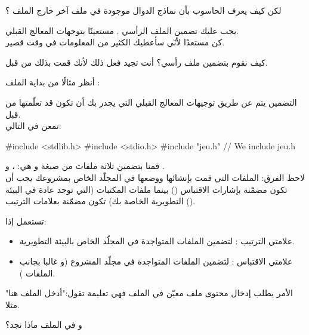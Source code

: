 \begin{question}
  لكن كيف يعرف الحاسوب بأن نماذج الدوال موجودة في ملف آخر خارج الملف
؟
\end{question}

يجب عليك تضمين الملف الرأسي
.
مستعينًا بتوجهات المعالج القبلي.\\
كن مستعدًا لأنّي سأعطيك الكثير من المعلومات في وقت قصير.

كيف نقوم بتضمين ملف رأسي؟ أنت تجيد فعل ذلك لأنك قمت بذلك من قبل.

أنظر مثالًا من بداية الملف
:

\begin{Csource}
#include <stdlib.h>
#include <stdio.h>
#include "jeu.h"
void play(SDL_Surface* screen)
{
// ...
\end{Csource}

التضمين يتم عن طريق توجيهات المعالج القبلي
التي يجدر بك أن تكون قد تعلّمتها من قبل.\\
تمعن في التالي:

\begin{Csource}
#include <stdlib.h>
#include <stdio.h>
#include "jeu.h" // We include jeu.h
\end{Csource}

قمنا بتضمين ثلاثة ملفات من صيغة
و هي:
،  و .\\
لاحظ الفرق: الملفات التي قمت بإنشائها ووضعها في المجلّد الخاص بمشروعك يجب أن تكون مضمّنة بإشارات الاقتباس
()
بينما ملفات المكتبات (التي توجد عادة في البيئة التطويرية الخاصة بك) تكون مضمّنة بعلامات الترتيب
().

تستعمل إذا:

\begin{itemize}
  \item علامتي الترتيب
\InlineCode{< >}
: لتضمين الملفات المتواجدة في المجلّد
الخاص بالبيئة التطويرية.
  \item علامتي الاقتباس
: لتضمين  الملفات المتواجدة في مجلّد المشروع (و غالبا بجانب الملفات
).
\end{itemize}

الأمر
يطلب إدخال محتوى ملف معيّن في الملف
فهي تعليمة تقول:"أدخل الملف
هنا" مثلا.

\begin{question}
  و في الملف
ماذا نجد؟
\end{question}

